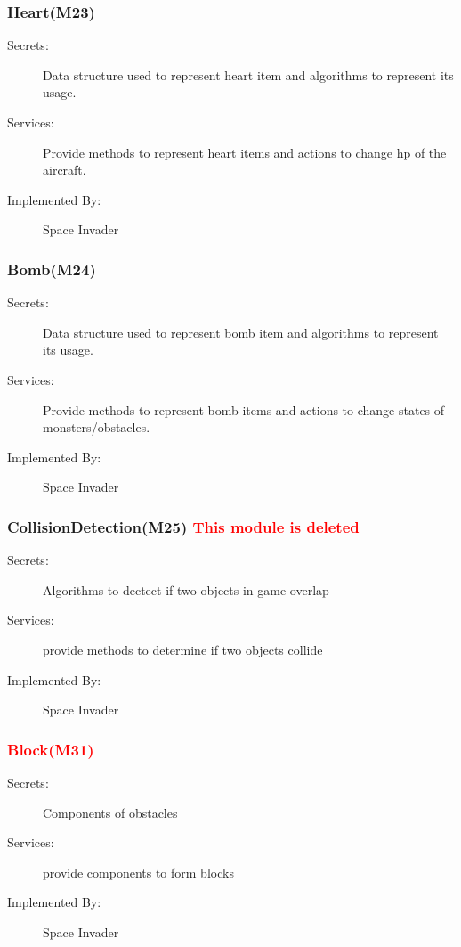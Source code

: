 \documentclass[12pt]{article}
\begin{document}
\subsubsection{Heart(M23)}
\begin{description}
\item[Secrets:] Data structure used to represent heart item and algorithms to represent its usage.
\item[Services:] Provide methods to represent heart items and actions to change hp of the aircraft. 
\item[Implemented By:] Space Invader
\end{description}

\subsubsection{Bomb(M24)}
\begin{description}
\item[Secrets:] Data structure used to represent bomb item and algorithms to represent its usage.
\item[Services:] Provide methods to represent bomb items and actions to change states of monsters/obstacles. 
\item[Implemented By:] Space Invader
\end{description}

\subsubsection{CollisionDetection(M25) \textcolor{red}{This module is deleted}}
\begin{description}
\item[Secrets:] Algorithms to dectect if two objects in game overlap
\item[Services:] provide methods to determine if two objects collide
\item[Implemented By:] Space Invader
\end{description}

\subsubsection{\textcolor{red}{Block(M31)}}
\begin{description}
\item[Secrets:] Components of obstacles
\item[Services:] provide components to form blocks
\item[Implemented By:] Space Invader
\end{description}
\end{document}
